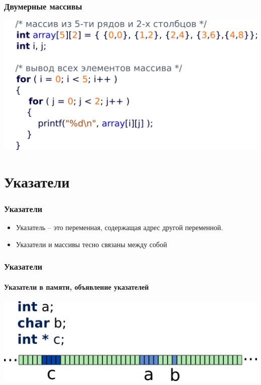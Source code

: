 \documentclass[12pt,pdf,hyperref={unicode}]{beamer}
\begin{document}
\begin{frame}[fragile]
\frametitle{Двумерные массивы} 
\begin{center}
\includegraphics[scale=0.95]{images/twodim_array.png}
\end{center}
\end{frame}







\section{Указатели}


\begin{frame}[fragile]
\frametitle{Указатели} 
\begin{itemize}
\item Указатель -- это переменная, содержащая адрес другой переменной.
\item Указатели и массивы тесно связаны между собой
\end{itemize}
\end{frame}


\begin{frame}[fragile]
\frametitle{Указатели} 
\framesubtitle{Указатели в памяти, объявление указателей}
\begin{center}
\includegraphics[width=0.95\linewidth]{images/memory_pointer_1.png}
\end{center}
\end{frame}
\end{document}
